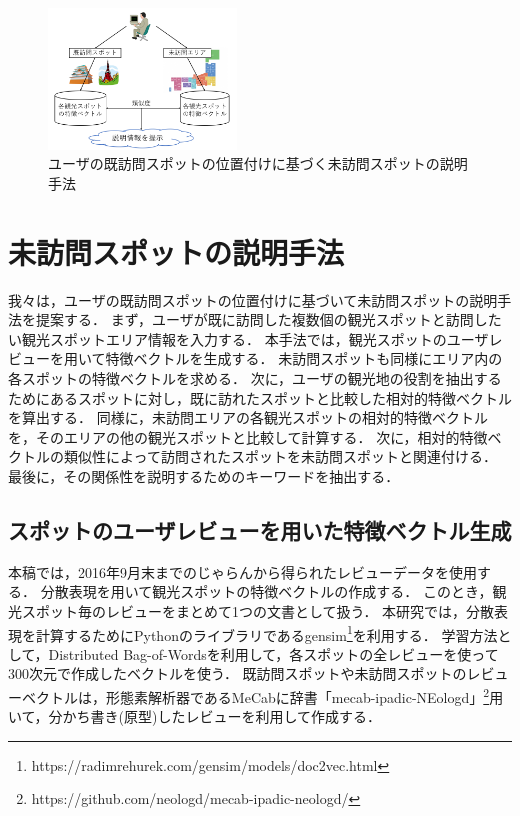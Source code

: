 \documentclass[submit]{ipsj}
\begin{document}
\begin{figure}[t]
  \begin{center}
    \includegraphics[clip,width=5.0cm]{picture/Photo_Image_jap.png}
    \caption{ユーザの既訪問スポットの位置付けに基づく未訪問スポットの説明手法}
    \label{fig:Photo_Image}
   \end{center}
\end{figure}


\section{未訪問スポットの説明手法}
\label{sec:未訪問スポットの説明手法}
我々は，ユーザの既訪問スポットの位置付けに基づいて未訪問スポットの説明手法を提案する．
まず，ユーザが既に訪問した複数個の観光スポットと訪問したい観光スポットエリア情報を入力する．
本手法では，観光スポットのユーザレビューを用いて特徴ベクトルを生成する．
未訪問スポットも同様にエリア内の各スポットの特徴ベクトルを求める．
次に，ユーザの観光地の役割を抽出するためにあるスポットに対し，既に訪れたスポットと比較した相対的特徴ベクトルを算出する．
同様に，未訪問エリアの各観光スポットの相対的特徴ベクトルを，そのエリアの他の観光スポットと比較して計算する．
次に，相対的特徴ベクトルの類似性によって訪問されたスポットを未訪問スポットと関連付ける．
最後に，その関係性を説明するためのキーワードを抽出する．

\subsection{スポットのユーザレビューを用いた特徴ベクトル生成}
\label{subsec:スポットのレビューから特徴ベクトル生成}
本稿では，2016年9月末までのじゃらんから得られたレビューデータを使用する．
分散表現を用いて観光スポットの特徴ベクトルの作成する．
このとき，観光スポット毎のレビューをまとめて1つの文書として扱う．
本研究では，分散表現を計算するためにPythonのライブラリであるgensim\footnote{https://radimrehurek.com/gensim/models/doc2vec.html}を利用する．
学習方法として，Distributed Bag-of-Wordsを利用して，各スポットの全レビューを使って300次元で作成したベクトルを使う．
既訪問スポットや未訪問スポットのレビューベクトルは，形態素解析器であるMeCab\cite{Codd11}に辞書「mecab-ipadic-NEologd」\footnote{https://github.com/neologd/mecab-ipadic-neologd/}用いて，分かち書き(原型)したレビューを利用して作成する．
\end{document}
